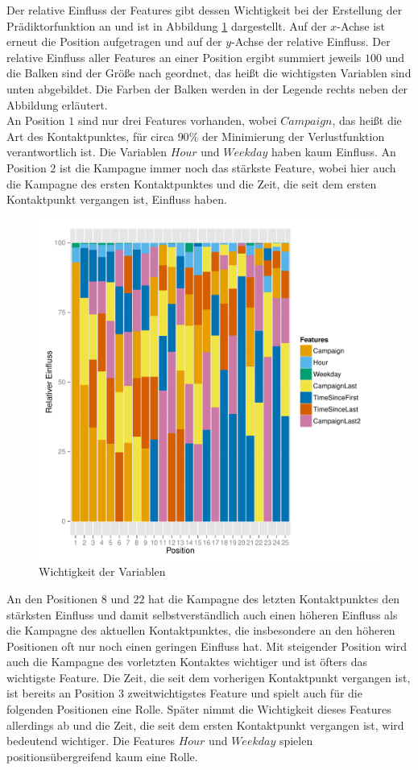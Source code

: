 Der relative Einfluss der Features gibt dessen Wichtigkeit bei der Erstellung der Prädiktorfunktion an und ist in Abbildung \ref{variable_importance} dargestellt. Auf der $x$-Achse ist erneut die Position aufgetragen und auf der $y$-Achse der relative Einfluss. Der relative Einfluss aller Features an einer Position ergibt summiert jeweils $100$ und die Balken sind der Größe nach geordnet, das heißt die wichtigsten Variablen sind unten abgebildet. Die Farben der Balken werden in der Legende rechts neben der Abbildung erläutert.\\
An Position $1$ sind nur drei Features vorhanden, wobei $Campaign$, das heißt die Art des Kontaktpunktes, für circa $90 \%$ der Minimierung der Verlustfunktion verantwortlich ist. Die Variablen $Hour$ und $Weekday$ haben kaum Einfluss. An Position $2$ ist die Kampagne immer noch das stärkste Feature, wobei hier auch die Kampagne des ersten Kontaktpunktes und die Zeit, die seit dem ersten Kontaktpunkt vergangen ist, Einfluss haben.\\
\begin{figure}[H]
	\centering\includegraphics[scale=0.9]{variableImportance.pdf}\caption{Wichtigkeit der Variablen}\label{variable_importance}
\end{figure}
An den Positionen $8$ und $22$ hat die Kampagne des letzten Kontaktpunktes den stärksten Einfluss und damit selbstverständlich auch einen höheren Einfluss als die Kampagne des aktuellen Kontaktpunktes, die insbesondere an den höheren Positionen oft nur noch einen geringen Einfluss hat. Mit steigender Position wird auch die Kampagne des vorletzten Kontaktes wichtiger und ist öfters das wichtigste Feature. Die Zeit, die seit dem vorherigen Kontaktpunkt vergangen ist, ist bereits an Position $3$ zweitwichtigstes Feature und spielt auch für die folgenden Positionen eine Rolle. Später nimmt die Wichtigkeit dieses Features allerdings ab und die Zeit, die seit dem ersten Kontaktpunkt vergangen ist, wird bedeutend wichtiger. Die Features $Hour$ und $Weekday$ spielen positionsübergreifend kaum eine Rolle.\\
